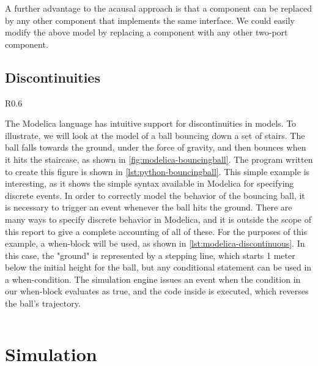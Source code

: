 \documentclass[\rootfolder/main.tex]{subfiles}
\begin{document}
A further advantage to the acausal approach is that a component can be replaced by any other component that implements the same interface.
We could easily modify the above model by replacing a component with any other two-port component.

\subsection{Discontinuities}

\begin{wrapfigure}{R}{0.6\columnwidth}
    \caption{Ball bouncing down stairs.\label{fig:modelica-bouncingball}}
\end{wrapfigure}

The Modelica language has intuitive support for discontinuities in models.
To illustrate, we will look at the model of a ball bouncing down a set of stairs.
The ball falls towards the ground, under the force of gravity, and then bounces when it hits the staircase, as shown in \cref{fig:modelica-bouncingball}.
The program written to create this figure is shown in \cref{lst:python-bouncingball}.
This simple example is interesting, as it shows the simple syntax available in Modelica for specifying discrete events.
In order to correctly model the behavior of the bouncing ball, it is necessary to trigger an event whenever the ball hits the ground.
There are many ways to specify discrete behavior in Modelica, and it is outside the scope of this report to give a complete accounting of all of these.
For the purposes of this example, a when-block will be used, as shown in \cref{lst:modelica-discontinuous}.
In this case, the "ground" is represented by a stepping line, which starts 1 meter below the initial height for the ball, but any conditional statement can be used in a when-condition.
The simulation engine issues an event when the condition in our when-block evaluates as true, and the code inside is executed, which reverses the ball's trajectory.

\begin{listing}[ht]
    \inputminted{Modelica}{\rootfolder/Models/MasterProject/Models/BouncingBall.mo}
    \caption{Bouncing ball model showing discontinuous equation\label{lst:modelica-discontinuous}}
\end{listing}

\section{Simulation}
\end{document}

